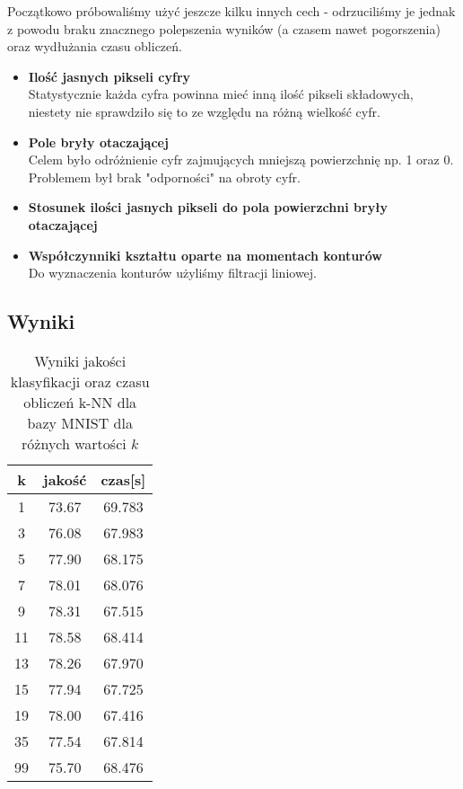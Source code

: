 \documentclass{classrep}
\begin{document}
Początkowo próbowaliśmy użyć jeszcze kilku innych cech - odrzuciliśmy je jednak z powodu braku znacznego polepszenia wyników (a czasem nawet pogorszenia) oraz wydłużania czasu obliczeń.

\begin{itemize}
\item \textbf{Ilość jasnych pikseli cyfry}\\
 Statystycznie każda cyfra powinna mieć inną ilość pikseli składowych, niestety nie sprawdziło się to ze względu na różną wielkość cyfr.
\item \textbf{Pole bryły otaczającej}\\
 Celem było odróżnienie cyfr zajmujących mniejszą powierzchnię np. 1 oraz 0. Problemem był brak "odporności" na obroty cyfr.
\item \textbf{Stosunek ilości jasnych pikseli do pola powierzchni bryły otaczającej}
\item \textbf{Współczynniki kształtu oparte na momentach konturów}\\
Do wyznaczenia konturów użyliśmy filtracji liniowej.
\end{itemize}

\subsection{Wyniki}

\begin{table}[h!]
  \centering
  \caption{Wyniki jakości klasyfikacji oraz czasu obliczeń k-NN dla bazy MNIST dla różnych wartości $k$}
  \label{tab:tab1}
  \begin{tabular}{|c|c|c|}
    \hline
	k & jakość & czas[s]\\
    \hline
	1 & 73.67 & 69.783\\
    \hline
	3 & 76.08 & 67.983\\
	\hline
	5 & 77.90 & 68.175\\
	\hline
	7 & 78.01 & 68.076\\
	\hline
	9 & 78.31 & 67.515\\
	\hline
	11 & 78.58 & 68.414\\
	\hline
	13 & 78.26 & 67.970\\
	\hline
	15 & 77.94 & 67.725\\
	\hline
	19 & 78.00 & 67.416\\
	\hline
	35 & 77.54 & 67.814\\
	\hline
	99 & 75.70 & 68.476\\
	\hline
  \end{tabular}
\end{table}
\end{document}
